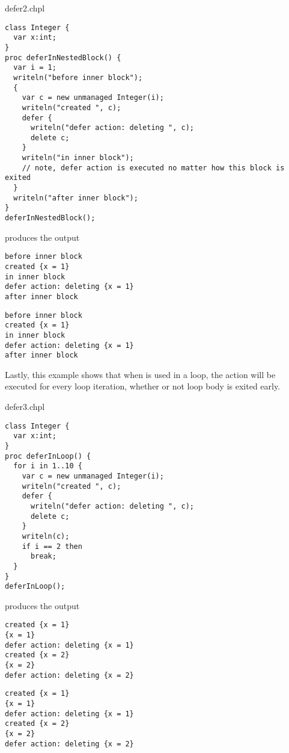 \begin{chapelexample}{defer2.chpl}
\begin{chapel}
\begin{verbatim}
class Integer {
  var x:int;
}
proc deferInNestedBlock() {
  var i = 1;
  writeln("before inner block");
  {
    var c = new unmanaged Integer(i);
    writeln("created ", c);
    defer {
      writeln("defer action: deleting ", c);
      delete c;
    }
    writeln("in inner block");
    // note, defer action is executed no matter how this block is exited
  }
  writeln("after inner block");
}
deferInNestedBlock();
\end{verbatim}
\end{chapel}
produces the output
\begin{chapeloutput}
\begin{verbatim}
before inner block
created {x = 1}
in inner block
defer action: deleting {x = 1}
after inner block
\end{verbatim}
\end{chapeloutput}
\begin{commandline}
\begin{verbatim}
before inner block
created {x = 1}
in inner block
defer action: deleting {x = 1}
after inner block
\end{verbatim}
\end{commandline}

\end{chapelexample}

Lastly, this example shows that when  is used in a loop, the
action will be executed for every loop iteration, whether or not loop
body is exited early.

\begin{chapelexample}{defer3.chpl}
\begin{chapel}
\begin{verbatim}
class Integer {
  var x:int;
}
proc deferInLoop() {
  for i in 1..10 {
    var c = new unmanaged Integer(i);
    writeln("created ", c);
    defer {
      writeln("defer action: deleting ", c);
      delete c;
    }
    writeln(c);
    if i == 2 then
      break;
  }
}
deferInLoop();
\end{verbatim}
\end{chapel}
produces the output
\begin{chapeloutput}
\begin{verbatim}
created {x = 1}
{x = 1}
defer action: deleting {x = 1}
created {x = 2}
{x = 2}
defer action: deleting {x = 2}
\end{verbatim}
\end{chapeloutput}
\begin{commandline}
\begin{verbatim}
created {x = 1}
{x = 1}
defer action: deleting {x = 1}
created {x = 2}
{x = 2}
defer action: deleting {x = 2}
\end{verbatim}
\end{commandline}
\end{chapelexample}


